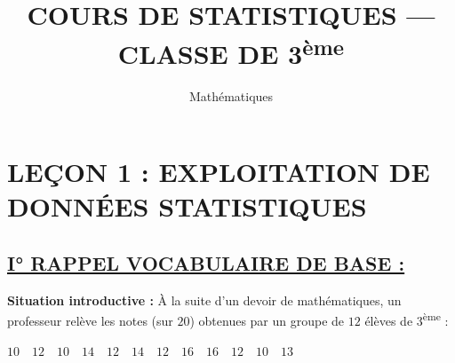 \documentclass[11pt, a4paper]{article}
\title{\textcolor{primary}{\textbf{COURS DE STATISTIQUES — CLASSE DE 3\textsuperscript{ème}}}}
\author{Mathématiques}
\date{}
\begin{document}
\maketitle
\thispagestyle{empty}

\section*{\textcolor{accent}{LEÇON 1 : EXPLOITATION DE DONNÉES STATISTIQUES}}

\subsection*{\textcolor{primary}{\underline{I° RAPPEL VOCABULAIRE DE BASE :}}}

\begin{shaded}
\noindent\textbf{Situation introductive :} À la suite d'un devoir de mathématiques, un professeur relève les notes (sur $20$) obtenues par un groupe de $12$ élèves de 3\textsuperscript{ème} :
\begin{center}
$10 \quad 12 \quad 10 \quad 14 \quad 12 \quad 14 \quad 12 \quad 16 \quad 16 \quad 12 \quad 10 \quad 13$
\end{center}
\end{shaded}
\end{document}
